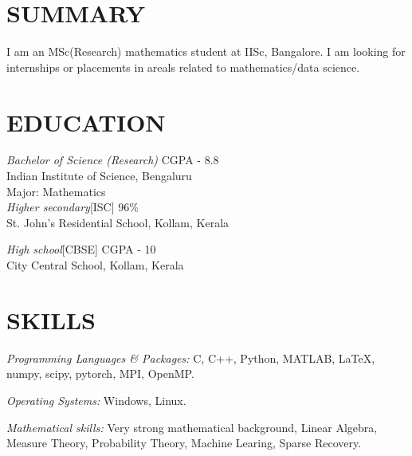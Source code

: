 \documentclass[margin, 10pt]{res} %
\begin{document}
\begin{resume}

 
\section{SUMMARY}  

	I am an MSc(Research) mathematics student at IISc, Bangalore.
	I am looking for internships or placements in areals related to
	mathematics/data science.


\section{EDUCATION}
{\sl Bachelor of Science (Research)} \hfill CGPA - 8.8\\
Indian Institute of Science, Bengaluru\\
Major: Mathematics\\

{\sl Higher secondary}[ISC]  \hfill  96\%\\
St. John's Residential School, Kollam, Kerala

{\sl High school}[CBSE] \hfill CGPA - 10\\
City Central School, Kollam, Kerala 


\section{SKILLS} 

{\sl Programming Languages \& Packages:} 
 C, C++, Python, MATLAB, \LaTeX,
	numpy, scipy, pytorch, MPI, OpenMP.

{\sl Operating Systems:} Windows, Linux.

{\sl Mathematical skills:} Very strong mathematical background,
	Linear Algebra, Measure Theory, Probability Theory,
	Machine Learing, Sparse Recovery.


\end{resume}
\end{document}
